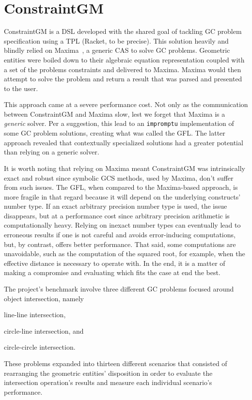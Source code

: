 \section{ConstraintGM}%
\label{sec:eval.cgm}

ConstraintGM is a \ac{DSL} developed with the shared goal of tackling \ac{GC}
problem specification using a \ac{TPL} (Racket, to be precise).  This solution
heavily and blindly relied on Maxima~\cite{Maxima:2021:Maxima}, a generic
\ac{CAS} to solve \ac{GC} problems.  Geometric entities were boiled down to
their algebraic equation representation coupled with a set of the problems
constraints and delivered to Maxima.  Maxima would then attempt to solve the
problem and return a result that was parsed and presented to the user.

This approach came at a severe performance cost.  Not only as the communication
between ConstraintGM and Maxima slow, lest we forget that Maxima is a
\emph{generic} solver.  Per a suggestion, this lead to an \texttt{impromptu}
implementation of some \ac{GC} problem solutions, creating what was called the
\ac{GFL}. The latter approach revealed that contextually specialized solutions
had a greater potential than relying on a generic solver.

It is worth noting that relying on Maxima meant ConstraintGM was intrinsically
exact and robust since symbolic \ac{GCS} methods, used by Maxima, don't suffer
from such issues.  The \ac{GFL}, when compared to the Maxima-based approach, is
more fragile in that regard because it will depend on the underlying constructs'
number type.  If an exact arbitrary precision number type is used, the issue
disappears, but at a performance cost since arbitrary precision arithmetic is
computationally heavy.  Relying on inexact number types can eventually lead to
erroneous results if one is not careful and avoids error-inducing computations,
but, by contrast, offers better performance.  That said, some computations are
unavoidable, such as the computation of the squared root, for example, when the
effective distance is necessary to operate with.  In the end, it is a matter of
making a compromise and evaluating which fits the case at end the best.

The project's benchmark involve three different \ac{GC} problems focused around
object intersection, namely
\begin{enumerate*}[label= (\arabic*)]
  \item line-line intersection,
  \item circle-line intersection, and
  \item circle-circle intersection.
\end{enumerate*}
These problems expanded into thirteen different scenarios that consisted of
rearranging the geometric entities' disposition in order to evaluate the
intersection operation's results and measure each individual scenario's
performance.

